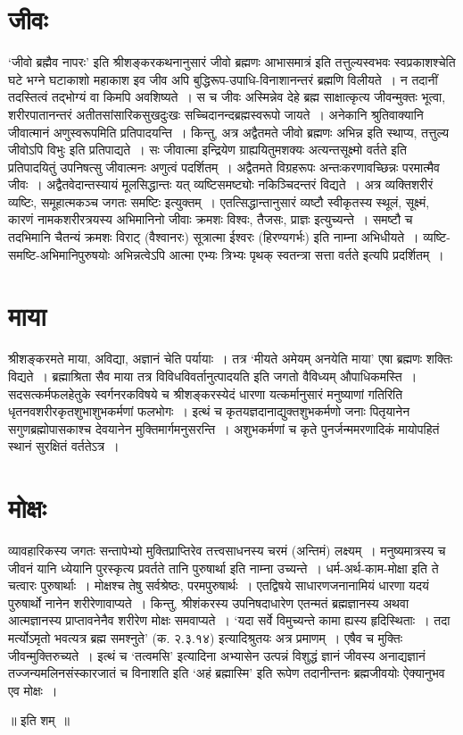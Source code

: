 {\section*{जीवः}

‘जीवो ब्रह्मैव नापरः’ इति श्रीशङ्करकथनानुसारं जीवो ब्रह्मणः आभासमात्रं इति तत्तुल्यस्वभवः स्वप्रकाशश्चेति घटे भग्ने घटाकाशो महाकाश इव जीव अपि बुद्धिरूप-उपाधि-विनाशानन्तरं ब्रह्मणि विलीयते~। न तदानीं तदस्तित्वं तद्भोग्यं वा किमपि अवशिष्यते~। स च जीवः अस्मिन्नेव देहे ब्रह्म साक्षात्कृत्य जीवन्मुक्तः भूत्वा, शरीरपातानन्तरं अतीतसांसारिकसुखदुःखः सच्चिदानन्दब्रह्मस्वरूपो जायते~। 
अनेकानि श्रुतिवाक्यानि जीवात्मानं अणुस्वरूपमिति प्रतिपादयन्ति~। किन्तु, अत्र अद्वैतमते जीवो ब्रह्मणः अभिन्न इति स्थाप्य, तत्तुल्य जीवोऽपि विभुः इति प्रतिपाद्यते~। सः जीवात्मा इन्द्रियेण ग्राह्ययितुमशक्यः अत्यन्तसूक्ष्मो वर्तते इति प्रतिपादयितुं उपनिषत्सु जीवात्मनः अणुत्वं पदर्शितम्~। अद्वैतमते विग्रहरूपः अन्तःकरणावच्छिन्नः परमात्मैव जीवः~। 
अद्वैतवेदान्तस्यायं मूलसिद्धान्तः यत् व्यष्टिसमष्ट्योः नकिञ्चिदन्तरं विद्यते~। अत्र व्यक्तिशरीरं व्यष्टिः, समूहात्मकञ्च जगतः समष्टिः इत्युक्तम्~। एतत्सिद्धान्तानुसारं व्यष्टौ स्वीकृतस्य स्थूलं, सूक्ष्मं, कारणं नामकशरीरत्रयस्य अभिमानिनो जीवाः क्रमशः विश्वः, तैजसः, प्राज्ञः इत्युच्यन्ते~। समष्टौ च तदभिमानि चैतन्यं क्रमशः विराट् (वैश्वानरः) सूत्रात्मा ईश्वरः (हिरण्यगर्भः) इति नाम्ना अभिधीयते~। व्यष्टि-समष्टि-अभिमानिपुरुषयोः अभिन्नत्वेऽपि आत्मा एभ्यः त्रिभ्यः पृथक् स्वतन्त्रा सत्ता वर्तते इत्यपि प्रदर्शितम्~। 

\section*{माया}

श्रीशङ्करमते माया, अविद्या, अज्ञानं चेति पर्यायाः~। तत्र ‘मीयते अमेयम् अनयेति माया’ एषा ब्रह्मणः शक्तिः विद्यते~। ब्रह्माश्रिता सैव माया तत्र विविधविवर्तानुत्पादयति इति जगतो वैविध्यम् औपाधिकमस्ति~। सदसत्कर्मफलहेतुके स्वर्गनरकविषये च श्रीशङ्करस्येदं धारणा यत्कर्मानुसारं मनुष्याणां गतिरिति धृतनवशरीरकृतशुभाशुभकर्मणां फलभोगः~। इत्थं च कृतयज्ञदानाद्युक्तशुभकर्मणो जनाः पितृयानेन सगुणब्रह्मोपासकाश्च देवयानेन मुक्तिमार्गमनुसरन्ति~। अशुभकर्मणां च कृते पुनर्जन्ममरणादिकं मायोपहितं स्थानं सुरक्षितं वर्ततेऽत्र~। 

\section*{मोक्षः}

व्यावहारिकस्य जगतः सन्तापेभ्यो मुक्तिप्राप्तिरेव तत्त्वसाधनस्य चरमं (अन्तिमं) लक्ष्यम्~। मनुष्यमात्रस्य च जीवनं यानि ध्येयानि पुरस्कृत्य प्रवर्तते तानि पुरुषार्था इति नाम्ना उच्यन्ते~। धर्म-अर्थ-काम-मोक्षा इति ते चत्वारः पुरुषार्थाः~। मोक्षश्च तेषु सर्वश्रेष्ठः, परमपुरुषार्थः~। एतद्विषये साधारणजनानामियं धारणा यदयं पुरुषार्थो नानेन शरीरेणावाप्यते~। किन्तु, श्रीशंकरस्य उपनिषदाधारेण एतन्मतं ब्रह्मज्ञानस्य अथवा आत्मज्ञानस्य प्राप्तावनेनैव शरीरेण मोक्षः समवाप्यते~। ‘यदा सर्वे विमुच्यन्ते कामा ह्यस्य हृदिस्थिताः~। तदा मर्त्योऽमृतो भवत्यत्र ब्रह्म समश्नुते’ (क. २.३.१४) इत्यादिश्रुतयः अत्र प्रमाणम्~। एषैव च मुक्तिः जीवन्मुक्तिरुच्यते~। इत्थं च ‘तत्वमसि’ इत्यादिना अभ्यासेन उत्पन्नं विशुद्धं ज्ञानं जीवस्य अनाद्यज्ञानं तज्जन्यमलिनसंस्कारजातं च विनाशति इति ‘अहं ब्रह्मास्मि’ इति रूपेण तदानीन्तनः ब्रह्मजीवयोः ऐक्यानुभव एव मोक्षः~। 

\centerline{॥ इति शम्~॥}

\articleend
}
